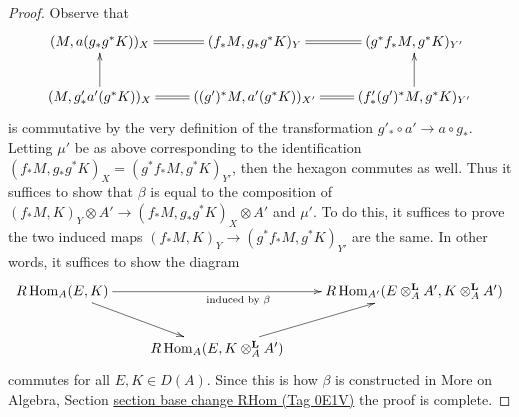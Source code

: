 \documentclass{amsart}
\theoremstyle{plain}
\theoremstyle{definition}
\theoremstyle{remark}
\numberwithin{equation}{subsection}
\def\Hom{\mathop{\mathrm{Hom}}\nolimits}
\begin{document}
\begin{proof}
\medskip\noindent
Observe that
$$
\xymatrix{
(M, a(g_*g^*K))_X &
(f_*M, g_* g^*K)_Y \ar@{=}[l] &
(g^*f_*M, g^*K)_{Y'} \ar@{=}[l] \\
(M, g'_* a'(g^*K))_X \ar[u] &
((g')^*M, a'(g^*K))_{X'} \ar@{=}[l] &
(f'_*(g')^*M, g^*K)_{Y'} \ar@{=}[l] \ar[u]
}
$$
is commutative by the very definition of the transformation
$g'_* \circ a' \to a \circ g_*$. Letting $\mu'$ be as above
corresponding to the identification
$(f_*M, g_*g^*K)_X = (g^*f_*M, g^*K)_{Y'}$, then the
hexagon commutes as well. Thus it suffices to show that
$\beta$ is equal to the composition of
$(f_*M, K)_Y \otimes A' \to (f_*M, g_*g^*K)_X \otimes A'$
and $\mu'$. To do this, it suffices to prove the two induced maps
$(f_*M, K)_Y \to (g^*f_*M, g^*K)_{Y'}$ are the same.
In other words, it suffices to show the diagram
$$
\xymatrix{
R\Hom_A(E, K) \ar[rr]_{\text{induced by }\beta} \ar[rd] & &
R\Hom_{A'}(E \otimes_A^\mathbf{L} A', K \otimes_A^\mathbf{L} A') \\
& R\Hom_A(E, K \otimes_A^\mathbf{L} A') \ar[ru]
}
$$
commutes for all $E, K \in D(A)$. Since this is how $\beta$ is constructed in
More on Algebra, Section \href{https://stacks.math.columbia.edu/tag/0E1V}{section base change RHom (Tag 0E1V)}
the proof is complete.
\end{proof}
\end{document}

